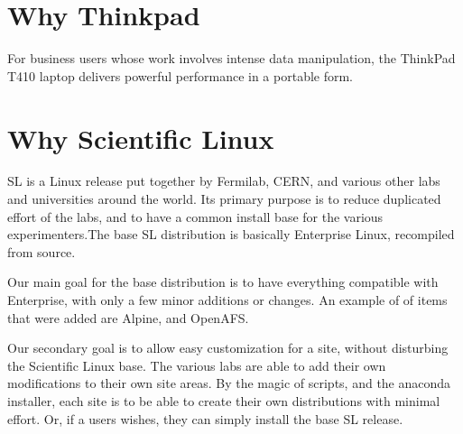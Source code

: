 \section{Why Thinkpad}
For business users whose work involves intense data manipulation, the ThinkPad
T410 laptop delivers powerful performance in a portable form.

\section{Why Scientific Linux}
SL is a Linux release put together by Fermilab, CERN, and various other labs and universities around the world. Its primary purpose is to reduce duplicated effort
of the labs, and to have a common install base for the various experimenters.The base SL distribution is basically Enterprise Linux, recompiled from source.

Our main goal for the base distribution is to have everything compatible with Enterprise, with only a few minor additions or changes. An example of of items that
 were added are Alpine, and OpenAFS.

Our secondary goal is to allow easy customization for a site, without disturbing the Scientific Linux base. The various labs are able to add their own modifications
to their own site areas. By the magic of scripts, and the anaconda installer, each site is to be able to create their own distributions with minimal effort. Or, if a
 users wishes, they can simply install the base SL release.